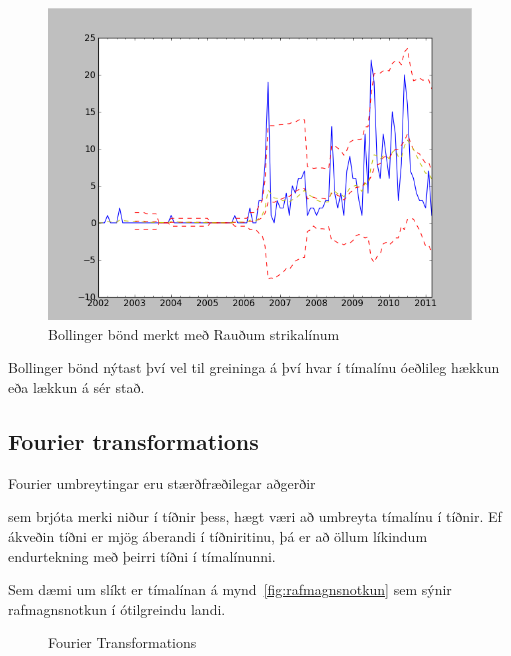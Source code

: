 \documentclass{article}
\begin{document}
\begin{figure}[H]
  \centering
  \includegraphics[width=.58\textwidth]{Bollinger.png} 
  \caption{Bollinger bönd merkt með Rauðum strikalínum} 
\end{figure}


Bollinger bönd nýtast því vel til greininga á því hvar í
tímalínu óeðlileg hækkun eða lækkun á sér stað.




\subsection{Fourier transformations} 

Fourier umbreytingar eru stærðfræðilegar aðgerðir

sem brjóta merki niður í tíðnir þess, hægt væri að umbreyta tímalínu í tíðnir. 
Ef ákveðin tíðni er mjög áberandi í tíðniritinu, þá er að öllum líkindum
endurtekning með þeirri tíðni í tímalínunni. 

Sem dæmi um slíkt er tímalínan á mynd~\ref{fig:rafmagnsnotkun} sem sýnir
rafmagnsnotkun í ótilgreindu landi.


\begin{figure}[H]
  \centering 
 
 
  \caption{Fourier Transformations}
  \label{fig:fourier}
\end{figure}
\end{document}
